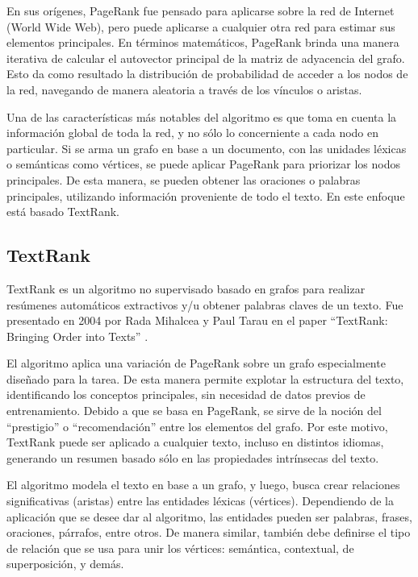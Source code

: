 \documentclass[a4paper]{article}
\begin{document}
En sus orígenes, PageRank fue pensado para aplicarse sobre la red de Internet (World Wide Web), pero puede aplicarse a cualquier otra red para estimar sus elementos principales. En términos matemáticos, PageRank brinda una manera iterativa de calcular el autovector principal de la matriz de adyacencia del grafo. Esto da como resultado la distribución de probabilidad de acceder a los nodos de la red, navegando de manera aleatoria a través de los vínculos o aristas.

Una de las características más notables del algoritmo es que toma en cuenta la información global de toda la red, y no sólo lo concerniente a cada nodo en particular. Si se arma un grafo en base a un documento, con las unidades léxicas o semánticas como vértices, se puede aplicar PageRank para priorizar los nodos principales. De esta manera, se pueden obtener las oraciones o palabras principales, utilizando información proveniente de todo el texto. En este enfoque está basado TextRank.


\subsection{TextRank}
TextRank es un algoritmo no supervisado basado en grafos para realizar resúmenes automáticos extractivos y/u obtener palabras claves de un texto. Fue presentado en 2004 por Rada Mihalcea y Paul Tarau en el paper “TextRank: Bringing Order into Texts” \cite{mihalcea-tarau}.

El algoritmo aplica una variación de PageRank \cite{pageetal98} sobre un grafo especialmente diseñado para la tarea. De esta manera permite explotar la estructura del texto, identificando los conceptos principales, sin necesidad de datos previos de entrenamiento. Debido a que se basa en PageRank, se sirve de la noción del “prestigio” o “recomendación” entre los elementos del grafo. Por este motivo, TextRank puede ser aplicado a cualquier texto, incluso en distintos idiomas, generando un resumen basado sólo en las propiedades intrínsecas del texto.

El algoritmo modela el texto en base a un grafo, y luego, busca crear relaciones significativas (aristas) entre las entidades léxicas (vértices). Dependiendo de la aplicación que se desee dar al algoritmo, las entidades pueden ser palabras, frases, oraciones, párrafos, entre otros. De manera similar, también debe definirse el tipo de relación que se usa para unir los vértices: semántica, contextual, de superposición, y demás.
\end{document}
